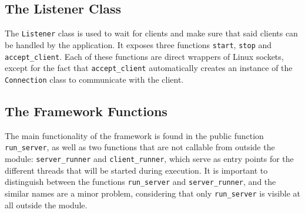 

\subsection{The Listener Class}

The \lstinline|Listener| class is used to wait for clients and make sure that said clients can be handled by the application. It exposes three functions \lstinline|start|, \lstinline|stop| and \lstinline|accept_client|.
Each of these functions are direct wrappers of Linux sockets, except for the fact that \lstinline|accept_client| automatically creates an instance of the \lstinline|Connection| class to communicate with
the client.

\subsection{The Framework Functions}

The main functionality of the framework is found in the public function \lstinline|run_server|, as well as two functions that are not callable from outside the module:
\lstinline|server_runner| and \lstinline|client_runner|, which serve as entry points for the different threads that will be started during execution.
It is important to distinguish between the functions \lstinline|run_server| and \lstinline|server_runner|, and the similar names are a minor problem,
considering that only \lstinline|run_server| is visible at all outside the module.

